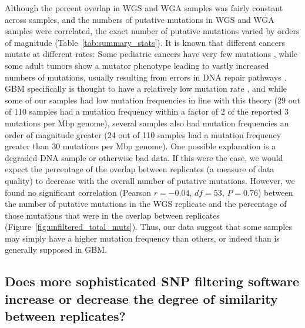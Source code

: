 \documentclass[11pt]{article} %
\begin{document}
Although the percent overlap in WGS and WGA samples was fairly constant across samples, and the numbers of putative mutations in WGS and WGA samples were correlated, the exact number of putative mutations varied by orders of magnitude (Table~\ref{tab:summary_stats}). It is known that different cancers mutate at different rates: Some pediatric cancers have very few mutations \citep{RB2hit, pediatric}, while some adult tumors show a mutator phenotype leading to vastly increased numbers of mutations, usually resulting from errors in DNA repair pathways \citep{mutator}. GBM specifically is thought to have a relatively low mutation rate \citep{Parsons, TCGA-GBM-13}, and while some of our samples had low mutation frequencies in line with this theory (29 out of 110 samples had a mutation frequency within a factor of 2 of the reported 3 mutations per Mbp genome), several samples also had mutation frequencies an order of magnitude greater (24 out of 110 samples had a mutation frequency greater than 30 mutations per Mbp genome). One possible explanation is a degraded DNA sample or otherwise bad data. If this were the case, we would expect the percentage of the overlap between replicates (a measure of data quality) to decrease with the overall number of putative mutations. However, we found no significant correlation (Pearson $r=-0.04$, $df=53$, $P=0.76$) between the number of putative mutations in the WGS replicate and the percentage of those mutations that were in the overlap between replicates (Figure~\ref{fig:unfiltered_total_muts}). Thus, our data suggest that some samples may simply have a higher mutation frequency than others, or indeed than is generally supposed in GBM.

\subsection*{Does more sophisticated SNP filtering software increase or decrease the degree of similarity between replicates?}
\end{document}
